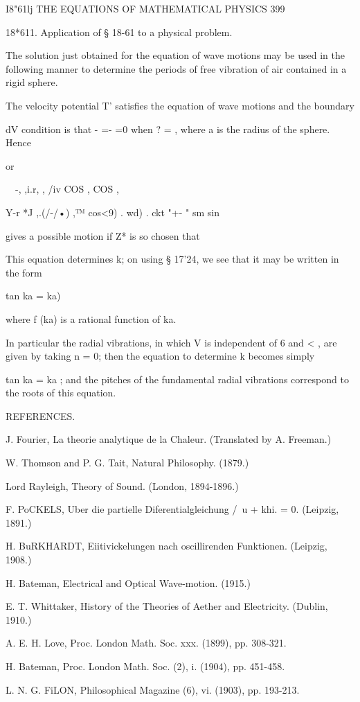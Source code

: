 I8"61lj THE EQUATIONS OF MATHEMATICAL PHYSICS 399

18*611. Application of § 18-61 to a physical problem.

The solution just obtained for the equation of wave motions may be
used in the following manner to determine the periods of free
vibration of air contained in a rigid sphere.

The velocity potential T' satisfies the equation of wave motions and
the boundary

dV condition is that - =- =0 when ? = , where a is the radius of the
sphere. Hence

or

~\ -, ,i.r, , /iv COS , COS ,

Y-r *J ,.(/-/•) ,™ cos<9) . wd) . ckt "+- " sm sin

gives a possible motion if Z* is so chosen that

This equation determines k; on using § 17'24, we see that it may be
written in the form

tan ka = ka)

where f (ka) is a rational function of ka.

In particular the radial vibrations, in which V is independent of 6
and < , are given by taking n = 0; then the equation to determine k
becomes simply

tan ka = ka ; and the pitches of the fundamental radial vibrations
correspond to the roots of this equation.

REFERENCES.

J. Fourier, La theorie analytique de la Chaleur. (Translated by A.
Freeman.)

W. Thomson and P. G. Tait, Natural Philosophy. (1879.)

Lord Rayleigh, Theory of Sound. (London, 1894-1896.)

F. PoCKELS, Uber die partielle Diferentialgleichung /\ u + khi. = 0.
(Leipzig, 1891.)

H. BuRKHARDT, Eiitivickelungen nach oscillirenden Funktionen.
(Leipzig, 1908.)

H. Bateman, Electrical and Optical Wave-motion. (1915.)

E. T. Whittaker, History of the Theories of Aether and Electricity.
(Dublin, 1910.)

A. E. H. Love, Proc. London Math. Soc. xxx. (1899), pp. 308-321.

H. Bateman, Proc. London Math. Soc. (2), i. (1904), pp. 451-458.

L. N. G. FiLON, Philosophical Magazine (6), vi. (1903), pp. 193-213.

